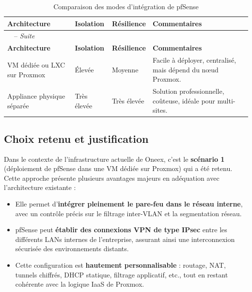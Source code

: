 \begin{longtable}{|p{4.5cm}|p{3.5cm}|p{3cm}|p{3.5cm}|}
	\caption{Comparaison des modes d’intégration de pfSense}
	\label{tab:pfsense_arch}                                                                                                               \\ \hline
	\textbf{Architecture}        & \textbf{Isolation} & \textbf{Résilience} & \textbf{Commentaires}                                        \\ \hline
	\endfirsthead
	\multicolumn{4}{l}{\tablename\ \thetable\ -- \textit{Suite}}                                                                           \\ \hline
	\textbf{Architecture}        & \textbf{Isolation} & \textbf{Résilience} & \textbf{Commentaires}                                        \\ \hline
	\endhead
	\endfoot
	\hline
	\endlastfoot

	VM dédiée ou LXC sur Proxmox & Élevée             & Moyenne             & Facile à déployer, centralisé, mais dépend du nœud Proxmox.  \\ \hline
	Appliance physique séparée   & Très élevée        & Très élevée         & Solution professionnelle, coûteuse, idéale pour multi-sites. \\ \hline
\end{longtable}

\subsection{Choix retenu et justification}

Dans le contexte de l’infrastructure actuelle de Oneex, c’est le \textbf{scénario 1} (déploiement de pfSense dans une VM dédiée sur Proxmox) qui a été retenu. Cette approche présente plusieurs avantages majeurs en adéquation avec l’architecture existante :

\begin{itemize}
	\item Elle permet d’\textbf{intégrer pleinement le pare-feu dans le réseau interne}, avec un contrôle précis sur le filtrage inter-VLAN et la segmentation réseau.
	\item pfSense peut \textbf{établir des connexions VPN de type IPsec} entre les différents LANs internes de l’entreprise, assurant ainsi une interconnexion sécurisée des environnements distants.
	\item Cette configuration est \textbf{hautement personnalisable} : routage, NAT, tunnels chiffrés, DHCP statique, filtrage applicatif, etc., tout en restant cohérente avec la logique IaaS de Proxmox.
\end{itemize}

